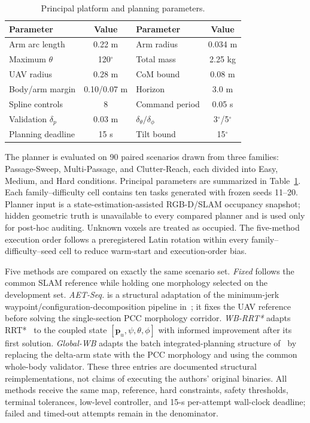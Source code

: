 \documentclass[journal,twoside]{IEEEtran}
\begin{document}
\begin{table}[t]
\centering
\caption{Principal platform and planning parameters.}
\label{tab:system_parameters}
\setlength{\tabcolsep}{4pt}
\begin{tabular}{lc@{\qquad}lc}
\toprule
Parameter & Value & Parameter & Value \\
\midrule
Arm arc length & 0.22 m & Arm radius & 0.034 m \\
Maximum $\theta$ & 120$^\circ$ & Total mass & 2.25 kg \\
UAV radius & 0.28 m & CoM bound & 0.08 m \\
Body/arm margin & 0.10/0.07 m & Horizon & 3.0 m \\
Spline controls & 8 & Command period & 0.05 s \\
Validation $\delta_p$ & 0.03 m & $\delta_\theta/\delta_\phi$ & 3$^\circ$/5$^\circ$ \\
Planning deadline & 15 s & Tilt bound & 15$^\circ$ \\
\bottomrule
\end{tabular}
\end{table}

The planner is evaluated on 90 paired scenarios drawn from three families: Passage-Sweep, Multi-Passage, and Clutter-Reach, each divided into Easy, Medium, and Hard conditions. Principal parameters are summarized in Table~\ref{tab:system_parameters}. Each family--difficulty cell contains ten tasks generated with frozen seeds 11--20. Planner input is a state-estimation-assisted RGB-D/SLAM occupancy snapshot; hidden geometric truth is unavailable to every compared planner and is used only for post-hoc auditing. Unknown voxels are treated as occupied. The five-method execution order follows a preregistered Latin rotation within every family--difficulty--seed cell to reduce warm-start and execution-order bias.

Five methods are compared on exactly the same scenario set. \emph{Fixed} follows the common SLAM reference while holding one morphology selected on the development set. \emph{AET-Seq.} is a structural adaptation of the minimum-jerk waypoint/configuration-decomposition pipeline in~\cite{peng2025aet}; it fixes the UAV reference before solving the single-section PCC morphology corridor. \emph{WB-RRT*} adapts RRT*~\cite{karaman2011sampling,meng2022rrtstar} to the coupled state $[\mathbf p_u,\psi,\theta,\phi]$ with informed improvement after its first solution. \emph{Global-WB} adapts the batch integrated-planning structure of~\cite{deng2025wholebody} by replacing the delta-arm state with the PCC morphology and using the common whole-body validator. These three entries are documented structural reimplementations, not claims of executing the authors' original binaries. All methods receive the same map, reference, hard constraints, safety thresholds, terminal tolerances, low-level controller, and 15-s per-attempt wall-clock deadline; failed and timed-out attempts remain in the denominator.
\end{document}
